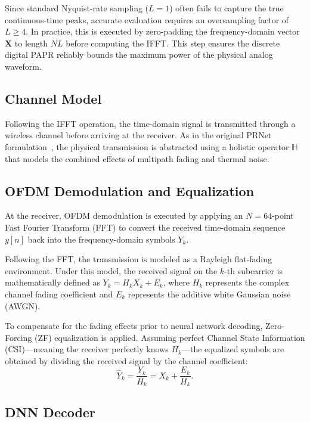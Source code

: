 Since standard Nyquist-rate sampling ($L=1$) often fails to capture the true continuous-time peaks, accurate evaluation requires an oversampling factor of $L \ge 4$. In practice, this is executed by zero-padding the frequency-domain vector $\bm{X}$ to length $NL$ before computing the IFFT. This step ensures the discrete digital PAPR reliably bounds the maximum power of the physical analog waveform.

\subsection{Channel Model}

Following the IFFT operation, the time-domain signal is transmitted through a wireless channel before arriving at the receiver. As in the original PRNet formulation~\cite{kim2017novel}, the physical transmission is abstracted using a holistic operator $\mathbb{H}$ that models the combined effects of multipath fading and thermal noise.

\subsection{OFDM Demodulation and Equalization}

At the receiver, OFDM demodulation is executed by applying an $N = 64$-point Fast Fourier Transform (FFT) to convert the received time-domain sequence $y[n]$ back into the frequency-domain symbols $Y_k$.

Following the FFT, the transmission is modeled as a Rayleigh flat-fading environment. Under this model, the received signal on the $k$-th subcarrier is mathematically defined as $Y_k = H_k X_k + E_k$, where $H_k$ represents the complex channel fading coefficient and $E_k$ represents the additive white Gaussian noise (AWGN).

To compensate for the fading effects prior to neural network decoding, Zero-Forcing (ZF) equalization is applied. Assuming perfect Channel State Information (CSI)—meaning the receiver perfectly knows $H_k$—the equalized symbols are obtained by dividing the received signal by the channel coefficient:
\begin{equation*}
    \hat{Y}_k = \frac{Y_k}{H_k} = X_k + \frac{E_k}{H_k}.
\end{equation*}

\subsection{DNN Decoder}

